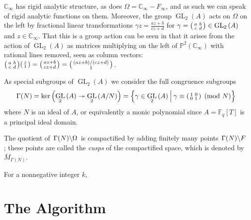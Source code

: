 \documentclass{article}
\newcommand*{\CCi}{\mathbb{C}_\infty}
\newcommand*{\FF}{\mathbb{F}}
\newcommand*{\PP}{\mathbb{P}}
\newcommand*{\onto}{\twoheadrightarrow}
\DeclareMathOperator{\GLL}{GL}
\newcommand*{\GL}[2][]{\GLL_{#1}\parens{#2}}
\newcommand*{\setst}[2]{\left\{#1\:\middle|\:#2\right\}}
\newcommand*{\parens}[1]{\left(#1\right)}
\newcommand*{\lquotient}[2]{\left. #1 \middle\backslash #2 \right.}
\begin{document}
$\CCi$ has rigid analytic structure, as does $\Omega = \CCi - F_\infty$, and as such we can speak of rigid analytic functions on them.
Moreover, the group $\GL[2]{A}$ acts on $\Omega$ on the left by fractional linear transformations $\gamma z = \frac{az+b}{cz+d}$ for $\gamma = \begin{psmallmatrix} a & b \\ c & d \end{psmallmatrix} \in \GL[2]{A}$ and $z \in \CCi$.
That this is a group action can be seen in that it arises from the action of $\GL[2]{A}$ as matrices multiplying on the left of $\PP^2(\CCi)$ with rational lines removed, seen as column vectors: $\begin{psmallmatrix} a & b \\ c & d \end{psmallmatrix} \begin{psmallmatrix} z \\ 1 \end{psmallmatrix} = \begin{psmallmatrix} a z + b \\ c z + d \end{psmallmatrix} = \begin{psmallmatrix} \parens{a z + b}/\parens{c z + d} \\ 1 \end{psmallmatrix}$.

As special subgroups of $\GL[2]{A}$ we consider the full congruence subgroups
\[ \Gamma(N) = \ker\parens{\GL[2]{A} \onto \GL[2]{A/N}} = \setst{\gamma \in \GL[2]{A}}{\gamma \equiv \begin{psmallmatrix} 1 & 0 \\ 0 & 1 \end{psmallmatrix} \pmod{N}} \]
where $N$ is an ideal of $A$, or equivalently a monic polynomial since $A = \FF_q[T]$ is a principal ideal domain.

The quotient of $\lquotient{\Gamma(N)}{\Omega}$ is compactified by adding finitely many points $\lquotient{\Gamma(N)}{F}$; these points are called the \emph{cusps} of the compactified space, which is denoted by $\overline{M}_{\Gamma(N)}$.


For a nonnegative integer $k$, %


\section{The Algorithm} \label{sec:algorithm}
\end{document}
